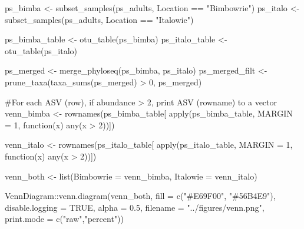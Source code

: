 \documentclass[
  letterpaper,
  DIV=11,
  numbers=noendperiod]{scrartcl}
\newenvironment{Shaded}{\begin{snugshade}}{\end{snugshade}}
\newcommand{\AttributeTok}[1]{\textcolor[rgb]{0.40,0.45,0.13}{#1}}
\newcommand{\CommentTok}[1]{\textcolor[rgb]{0.37,0.37,0.37}{#1}}
\newcommand{\ConstantTok}[1]{\textcolor[rgb]{0.56,0.35,0.01}{#1}}
\newcommand{\ControlFlowTok}[1]{\textcolor[rgb]{0.00,0.23,0.31}{#1}}
\newcommand{\DecValTok}[1]{\textcolor[rgb]{0.68,0.00,0.00}{#1}}
\newcommand{\FloatTok}[1]{\textcolor[rgb]{0.68,0.00,0.00}{#1}}
\newcommand{\FunctionTok}[1]{\textcolor[rgb]{0.28,0.35,0.67}{#1}}
\newcommand{\NormalTok}[1]{\textcolor[rgb]{0.00,0.23,0.31}{#1}}
\newcommand{\OtherTok}[1]{\textcolor[rgb]{0.00,0.23,0.31}{#1}}
\newcommand{\SpecialCharTok}[1]{\textcolor[rgb]{0.37,0.37,0.37}{#1}}
\newcommand{\StringTok}[1]{\textcolor[rgb]{0.13,0.47,0.30}{#1}}
\begin{document}
\begin{Shaded}
\begin{Highlighting}[]
\NormalTok{ps\_bimba }\OtherTok{\textless{}{-}} \FunctionTok{subset\_samples}\NormalTok{(ps\_adults, Location }\SpecialCharTok{==} \StringTok{"Bimbowrie"}\NormalTok{)}
\NormalTok{ps\_italo }\OtherTok{\textless{}{-}} \FunctionTok{subset\_samples}\NormalTok{(ps\_adults, Location }\SpecialCharTok{==} \StringTok{"Italowie"}\NormalTok{)}

\NormalTok{ps\_bimba\_table }\OtherTok{\textless{}{-}} \FunctionTok{otu\_table}\NormalTok{(ps\_bimba)}
\NormalTok{ps\_italo\_table }\OtherTok{\textless{}{-}} \FunctionTok{otu\_table}\NormalTok{(ps\_italo)}

\NormalTok{ps\_merged }\OtherTok{\textless{}{-}} \FunctionTok{merge\_phyloseq}\NormalTok{(ps\_bimba, ps\_italo)}
\NormalTok{ps\_merged\_filt }\OtherTok{\textless{}{-}} \FunctionTok{prune\_taxa}\NormalTok{(}\FunctionTok{taxa\_sums}\NormalTok{(ps\_merged) }\SpecialCharTok{\textgreater{}} \DecValTok{0}\NormalTok{, ps\_merged)}

\CommentTok{\#For each ASV (row), if abundance \textgreater{} 2, print ASV (rowname) to a vector}
\NormalTok{venn\_bimba }\OtherTok{\textless{}{-}} \FunctionTok{rownames}\NormalTok{(ps\_bimba\_table[ }\FunctionTok{apply}\NormalTok{(ps\_bimba\_table, }\AttributeTok{MARGIN =} \DecValTok{1}\NormalTok{,}
                                             \ControlFlowTok{function}\NormalTok{(x) }\FunctionTok{any}\NormalTok{(x }\SpecialCharTok{\textgreater{}} \DecValTok{2}\NormalTok{))])}

\NormalTok{venn\_italo }\OtherTok{\textless{}{-}} \FunctionTok{rownames}\NormalTok{(ps\_italo\_table[ }\FunctionTok{apply}\NormalTok{(ps\_italo\_table, }\AttributeTok{MARGIN =} \DecValTok{1}\NormalTok{,}
                                                  \ControlFlowTok{function}\NormalTok{(x) }\FunctionTok{any}\NormalTok{(x }\SpecialCharTok{\textgreater{}} \DecValTok{2}\NormalTok{))])}


\NormalTok{venn\_both }\OtherTok{\textless{}{-}} \FunctionTok{list}\NormalTok{(}\AttributeTok{Bimbowrie =}\NormalTok{ venn\_bimba, }
                  \AttributeTok{Italowie =}\NormalTok{ venn\_italo)}


\NormalTok{VennDiagram}\SpecialCharTok{::}\FunctionTok{venn.diagram}\NormalTok{(venn\_both, }
                          \AttributeTok{fill =} \FunctionTok{c}\NormalTok{(}\StringTok{"\#E69F00"}\NormalTok{, }\StringTok{"\#56B4E9"}\NormalTok{),}
                          \AttributeTok{disable.logging =} \ConstantTok{TRUE}\NormalTok{,}
                          \AttributeTok{alpha =} \FloatTok{0.5}\NormalTok{,}
                          \AttributeTok{filename =} \StringTok{"../figures/venn.png"}\NormalTok{,}
                          \AttributeTok{print.mode =} \FunctionTok{c}\NormalTok{(}\StringTok{"raw"}\NormalTok{,}\StringTok{"percent"}\NormalTok{))}
\end{Highlighting}
\end{Shaded}
\end{document}
